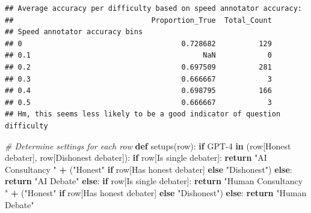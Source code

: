 \documentclass[
]{article}
\newenvironment{Shaded}{\begin{snugshade}}{\end{snugshade}}
\newcommand{\CommentTok}[1]{\textcolor[rgb]{0.56,0.35,0.01}{\textit{#1}}}
\newcommand{\ControlFlowTok}[1]{\textcolor[rgb]{0.13,0.29,0.53}{\textbf{#1}}}
\newcommand{\KeywordTok}[1]{\textcolor[rgb]{0.13,0.29,0.53}{\textbf{#1}}}
\newcommand{\NormalTok}[1]{#1}
\newcommand{\OperatorTok}[1]{\textcolor[rgb]{0.81,0.36,0.00}{\textbf{#1}}}
\newcommand{\StringTok}[1]{\textcolor[rgb]{0.31,0.60,0.02}{#1}}
\begin{document}
\begin{verbatim}
## Average accuracy per difficulty based on speed annotator accuracy:
##                                Proportion_True  Total_Count
## Speed annotator accuracy bins                              
## 0                                     0.728682          129
## 0.1                                        NaN            0
## 0.2                                   0.697509          281
## 0.3                                   0.666667            3
## 0.4                                   0.698795          166
## 0.5                                   0.666667            3
## Hm, this seems less likely to be a good indicator of question difficulty
\end{verbatim}

\begin{Shaded}
\begin{Highlighting}[]


\CommentTok{\# Determine settings for each row}
\KeywordTok{def}\NormalTok{ setups(row):}
    \ControlFlowTok{if} \StringTok{\textquotesingle{}GPT{-}4\textquotesingle{}} \KeywordTok{in}\NormalTok{ (row[}\StringTok{\textquotesingle{}Honest debater\textquotesingle{}}\NormalTok{], row[}\StringTok{\textquotesingle{}Dishonest debater\textquotesingle{}}\NormalTok{]):}
        \ControlFlowTok{if}\NormalTok{ row[}\StringTok{\textquotesingle{}Is single debater\textquotesingle{}}\NormalTok{]:}
            \ControlFlowTok{return} \StringTok{"AI Consultancy "} \OperatorTok{+}\NormalTok{ (}\StringTok{"Honest"} \ControlFlowTok{if}\NormalTok{ row[}\StringTok{\textquotesingle{}Has honest debater\textquotesingle{}}\NormalTok{] }\ControlFlowTok{else} \StringTok{"Dishonest"}\NormalTok{)}
        \ControlFlowTok{else}\NormalTok{:}
            \ControlFlowTok{return} \StringTok{"AI Debate"}
    \ControlFlowTok{else}\NormalTok{:}
        \ControlFlowTok{if}\NormalTok{ row[}\StringTok{\textquotesingle{}Is single debater\textquotesingle{}}\NormalTok{]:}
            \ControlFlowTok{return} \StringTok{"Human Consultancy "} \OperatorTok{+}\NormalTok{ (}\StringTok{"Honest"} \ControlFlowTok{if}\NormalTok{ row[}\StringTok{\textquotesingle{}Has honest debater\textquotesingle{}}\NormalTok{] }\ControlFlowTok{else} \StringTok{"Dishonest"}\NormalTok{)}
        \ControlFlowTok{else}\NormalTok{:}
            \ControlFlowTok{return} \StringTok{"Human Debate"}


\end{Highlighting}
\end{Shaded}
\end{document}
